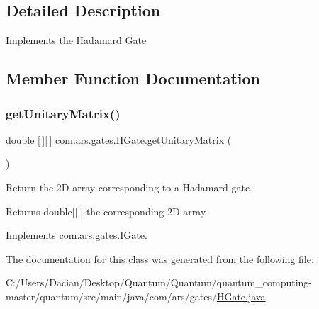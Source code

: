 \subsection{Detailed Description}
Implements the Hadamard Gate 

\subsection{Member Function Documentation}
\hypertarget{classcom_1_1ars_1_1gates_1_1_h_gate_a4749feb03fafcda241d9f854ef43a0d9}{}\label{classcom_1_1ars_1_1gates_1_1_h_gate_a4749feb03fafcda241d9f854ef43a0d9} 
\subsubsection{\texorpdfstring{get\+Unitary\+Matrix()}{getUnitaryMatrix()}}
{\footnotesize\ttfamily double \mbox{[}$\,$\mbox{]}\mbox{[}$\,$\mbox{]} com.\+ars.\+gates.\+H\+Gate.\+get\+Unitary\+Matrix (\begin{DoxyParamCaption}{ }\end{DoxyParamCaption})}

Return the 2D array corresponding to a Hadamard gate. \begin{DoxyReturn}{Returns}
double\mbox{[}\mbox{]}\mbox{[}\mbox{]} the corresponding 2D array 
\end{DoxyReturn}


Implements \hyperlink{interfacecom_1_1ars_1_1gates_1_1_i_gate_a6a940b3a6940cd97429aa211143121cb}{com.\+ars.\+gates.\+I\+Gate}.



The documentation for this class was generated from the following file\+:\begin{DoxyCompactItemize}
\item 
C\+:/\+Users/\+Dacian/\+Desktop/\+Quantum/\+Quantum/quantum\+\_\+computing-\/master/quantum/src/main/java/com/ars/gates/\hyperlink{_h_gate_8java}{H\+Gate.\+java}\end{DoxyCompactItemize}
